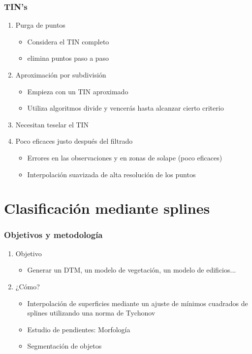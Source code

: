 \begin{frame}
  \frametitle{TIN's}
  \begin{enumerate}
    \item \alert<1-3>{Purga de puntos}
      \begin{itemize}
        \item<2-> Considera el TIN completo 
        \item<3-> elimina puntos paso a paso
      \end{itemize}
    \item \alert<4-5>{Aproximación por subdivisión}
      \begin{itemize}
        \item<4-> Empieza con un TIN aproximado
        \item<5-> Utiliza algoritmos \alert<5>{divide y vencerás} hasta alcanzar cierto
          criterio
      \end{itemize}
    \item<6-> Necesitan teselar el TIN 
    \item<7-> Poco eficaces \alert<7>{justo después} del filtrado
      \begin{itemize}
        \item Errores en las observaciones y en zonas de solape (poco eficaces)
        \item Interpolación suavizada de alta resolución de los puntos
      \end{itemize}
  \end{enumerate}
\end{frame}
\section{Clasificación mediante splines}
\begin{frame}
  \frametitle{Objetivos y metodología}
  \begin{enumerate}[<+->]
    \item Objetivo
    \begin{itemize}
       \item Generar un DTM, un modelo de \alert<2>{vegetación}, un modelo de
         \alert<2>{edificios}...
    \end{itemize}
    \item ¿Cómo?
    \begin{itemize}
      \item Interpolación de \alert<4>{superficies} mediante un ajuste de mínimos
            cuadrados de splines utilizando una norma de Tychonov
          \item Estudio de pendientes: \alert<5>{Morfología}
          \item \alert<6>{Segmentación} de objetos
    \end{itemize}
  \end{enumerate}
\end{frame}
